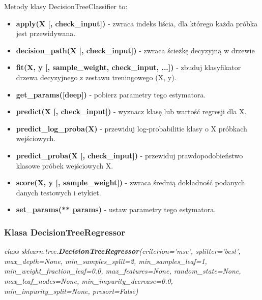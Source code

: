 \documentclass[10pt,a4paper]{article}
\begin{document}
\vskip 0.2in

Metody klasy DecisionTreeClassifier to:
\begin{itemize}
	\item \textbf{apply(X [, check\_input])} - zwraca indeks liścia, dla którego każda próbka jest przewidywana.
	\item \textbf{decision\_path(X [, check\_input])} - zwraca ścieżkę decyzyjną w drzewie
	\item \textbf{fit(X, y [, sample\_weight, check\_input, ...])} - zbuduj klasyfikator drzewa decyzyjnego z zestawu treningowego (X, y).
	\item \textbf{get\_params([deep])} - pobierz parametry tego estymatora.
	\item \textbf{predict(X [, check\_input])} - wyznacz klasę lub wartość regresji dla X.
	\item \textbf{predict\_log\_proba(X)} - przewiduj log-probabilitie klasy o X próbkach wejściowych.
	\item \textbf{predict\_proba(X [, check\_input])} - przewiduj prawdopodobieństwo klasowe próbek wejściowych X.
	\item \textbf{score(X, y [, sample\_weight])} - zwraca średnią dokładność podanych danych testowych i etykiet.
	\item \textbf{set\_params(** params)} - ustaw parametry tego estymatora.
\end{itemize}

\subsubsection{Klasa DecisionTreeRegressor}
\label{subsub:DecisionTreeRegressor}
\begin{flushleft}
	\textit{class sklearn.tree.\textbf{DecisionTreeRegressor}(criterion=’mse’, splitter=’best’, max\_depth=None, min\_samples\_split=2, min\_samples\_leaf=1, min\_weight\_fraction\_leaf=0.0, max\_features=None, random\_state=None, max\_leaf\_nodes=None, min\_impurity\_decrease=0.0, min\_impurity\_split=None, presort=False)}
\end{flushleft}\par
\vskip 0.2in
\end{document}
